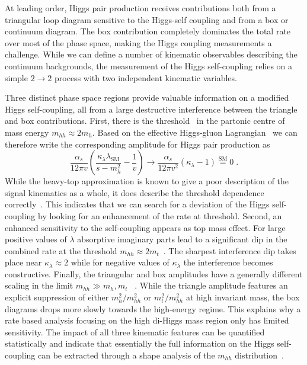 At leading order, Higgs pair production receives contributions both 
from a triangular loop diagram sensitive to the Higgs-self coupling 
and from a box or continuum diagram. The box contribution completely 
dominates the total rate over most of the phase space, making the Higgs 
coupling measurements a challenge. While we can define a number of
kinematic observables describing the continuum backgrounds, the
measurement of the Higgs self-coupling relies on a simple $2 \to 2$
process with two independent kinematic variables.

Three distinct phase space regions provide valuable information on a
modified Higgs self-coupling, all from a large destructive interference 
between the triangle and box contributions. First, there is the 
threshold~\cite{Plehn:1996wb, Djouadi:1999rca, Li:2013rra, Baur:2002rb, Baur:2002qd,Li:2015yia} in the partonic centre of mass energy 
$ m_{hh} \approx 2 m_h$. Based on the effective
Higgs-gluon Lagrangian~\cite{Shifman:1979eb,  Kniehl:1995tn, Spira:2016zna} we can therefore write the
corresponding amplitude for Higgs pair production as
%
\begin{equation}
\frac{\alpha_s}{12 \pi v}
\left( \frac{\kappa_\lambda \lambda_\text{SM}}{s-m_h^2} - \frac{1}{v} \right) 
\to
\frac{\alpha_s}{12 \pi v^2}
\left( \kappa_\lambda -1 \right) \stackrel{\text{SM}}{=} 0 \; .
\label{eq:higgs_pair}
\end{equation}
%
While the heavy-top approximation is known to give a poor description
of the signal kinematics as a whole, it does describe the threshold
dependence correctly~\cite{Baur:2002rb, Baur:2002qd,Li:2015yia}. 
This indicates that we can search
for a deviation of the Higgs self-coupling by looking for an
enhancement of the rate at threshold. 
Second, an enhanced sensitivity to the self-coupling appears as top
mass effect. For large positive values of $\lambda$ absorptive imaginary 
parts lead to a significant dip in the combined rate at the threshold 
$m_{hh} \approx 2 m_t $~\cite{Dolan:2012rv, Barr:2013tda, Kling:2016lay}. 
The sharpest interference dip takes place near $\kappa_\lambda\approx 2$
while for negative values of $\kappa_\lambda$ the interference 
becomes constructive.
Finally, the triangular and box amplitudes have a generally different
scaling in the limit $m_{hh} \gg m_h, m_t$
~\cite{Plehn:1996wb, Djouadi:1999rca, Li:2013rra,Dolan:2012rv, Barr:2013tda}. While the triangle amplitude features an 
explicit suppression of either $m_h^2/m_{hh}^2$ or 
$m_t^2/m_{hh}^2$ at high invariant mass, the box diagrams drops 
more slowly towards the high-energy regime. This explains why a 
rate based analysis focusing on the high di-Higgs mass region
only has limited sensitivity. The impact of all three kinematic features can be quantified
statistically and  indicate that essentially the full
information on the Higgs self-coupling can be extracted through a
shape analysis of the $m_{hh}$ distribution~\cite{Bauer:2017cov}. 

